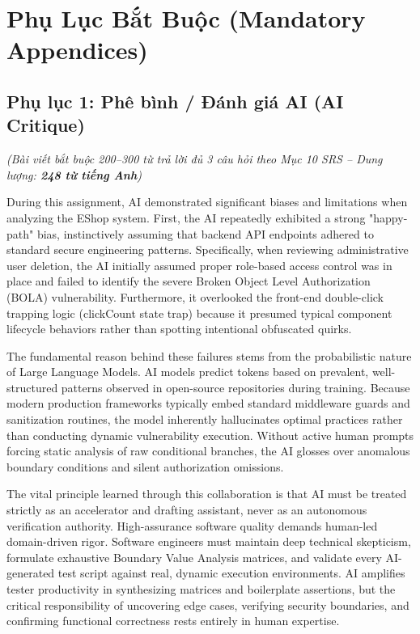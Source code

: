 \documentclass[11pt,a4paper]{article}
\begin{document}
\section{Phụ Lục Bắt Buộc (Mandatory Appendices)}

\subsection{Phụ lục 1: Phê bình / Đánh giá AI (AI Critique)}
\textit{(Bài viết bắt buộc 200--300 từ trả lời đủ 3 câu hỏi theo Mục 10 SRS -- Dung lượng: \textbf{248 từ tiếng Anh})}

\begin{infobox}
During this assignment, AI demonstrated significant biases and limitations when analyzing the EShop system. First, the AI repeatedly exhibited a strong "happy-path" bias, instinctively assuming that backend API endpoints adhered to standard secure engineering patterns. Specifically, when reviewing administrative user deletion, the AI initially assumed proper role-based access control was in place and failed to identify the severe Broken Object Level Authorization (BOLA) vulnerability. Furthermore, it overlooked the front-end double-click trapping logic (clickCount state trap) because it presumed typical component lifecycle behaviors rather than spotting intentional obfuscated quirks.

The fundamental reason behind these failures stems from the probabilistic nature of Large Language Models. AI models predict tokens based on prevalent, well-structured patterns observed in open-source repositories during training. Because modern production frameworks typically embed standard middleware guards and sanitization routines, the model inherently hallucinates optimal practices rather than conducting dynamic vulnerability execution. Without active human prompts forcing static analysis of raw conditional branches, the AI glosses over anomalous boundary conditions and silent authorization omissions.

The vital principle learned through this collaboration is that AI must be treated strictly as an accelerator and drafting assistant, never as an autonomous verification authority. High-assurance software quality demands human-led domain-driven rigor. Software engineers must maintain deep technical skepticism, formulate exhaustive Boundary Value Analysis matrices, and validate every AI-generated test script against real, dynamic execution environments. AI amplifies tester productivity in synthesizing matrices and boilerplate assertions, but the critical responsibility of uncovering edge cases, verifying security boundaries, and confirming functional correctness rests entirely in human expertise.
\end{infobox}
\end{document}
